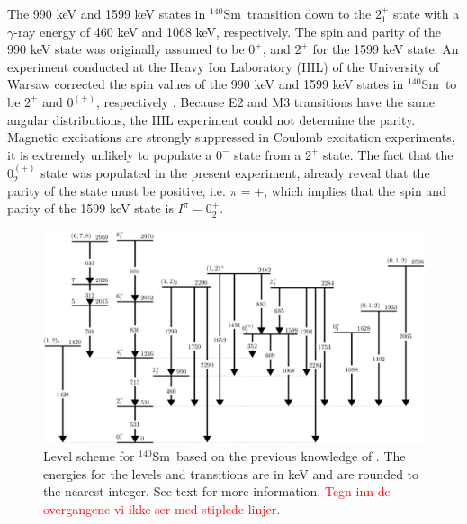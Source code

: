 \documentclass[twoside,english]{uiofysmaster/uiofysmaster}
\newcommand{\Sm}{$^{140}$Sm} %
\newcommand{\ga}{$\gamma$}
\begin{document}
The 990 keV and 1599 keV states in \Sm\ transition down to the $2_1^+$ state with a \ga-ray energy of 460 keV  and 1068 keV, respectively.
The spin and parity of the 990 keV \cite{Firestone} state was originally assumed to be $0^+$, and $2^+$ for the 1599 keV state.
An experiment conducted at the Heavy Ion Laboratory (HIL) of the University of Warsaw corrected the spin values of the 990 keV and 1599 keV states in \Sm\ to be $2^+$ and $0^{(+)}$, respectively \cite{Klintefjord2015, Samorajczyk2015}.
Because E2 and M3 transitions have the same angular distributions, the HIL experiment could not determine the parity. 
Magnetic excitations are strongly suppressed in Coulomb excitation experiments, it is extremely unlikely to populate a $0^-$ state from a $2^+$ state.
The fact that the $0_2^{(+)}$ state was populated in the present experiment, already reveal that the parity of the state must be positive, i.e. $\pi = +$, which implies that the spin and parity of the 1599 keV state is $I^\pi = 0_2^+$. 


\begin{figure}[ht!]
	\centering
	\includegraphics[width=\textwidth]{Images/Level-scheme-140Sm-v2.png}
	\caption{Level scheme for \Sm\ based on the previous knowledge of \cite{Klintefjord, NNDC-levels}. 
	The energies for the levels and transitions are in keV and are rounded to the nearest integer.
	See text for more information. \textcolor{red}{Tegn inn de overgangene vi ikke ser med stiplede linjer.}
	}
	\label{fig:levels}
\end{figure}
\end{document}
